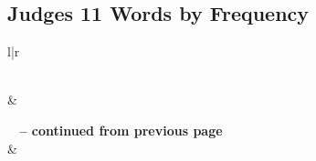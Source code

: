 

\subsection{Judges 11 Words by Frequency}


\normalsize
 
\begin{center}
\begin{longtable}{l|r}
\caption[Judges 11 Words by Frequency]{Judges 11 Words by Frequency}\label{table:WordsbyFrequency for Judges 11} \\
\hline {} &  \\ \hline 
\endfirsthead
 
{{\bfseries \tablename\ \thetable{} -- continued from previous page}} \\  
\hline {} &  \\ \hline 
\endhead
 

\end{longtable}
\end{center}
